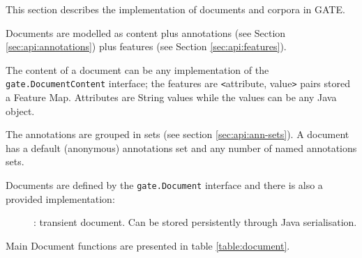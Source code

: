 This section describes the
implementation of documents and corpora in GATE.


Documents are modelled as content plus annotations (see Section
\ref{sec:api:annotations}) plus features (see Section
\ref{sec:api:features}).

The content of a document can be any implementation of the \linebreak\ {\tt
gate.DocumentContent} interface; the features are \verb!<!attribute,
value\verb!>! pairs stored a Feature Map. Attributes are String values while
the values can be any Java object.

The annotations are grouped in sets (see section \ref{sec:api:ann-sets}). A
document has a default (anonymous) annotations set and any number of named
annotations sets.

Documents are defined by the {\tt gate.Document} interface and there is also a
provided implementation:
\begin{description}
\item[{\tt {}}]: transient document. Can be stored
persistently through Java serialisation.
%
\end{description}

Main Document functions are presented in table \ref{table:document}.


